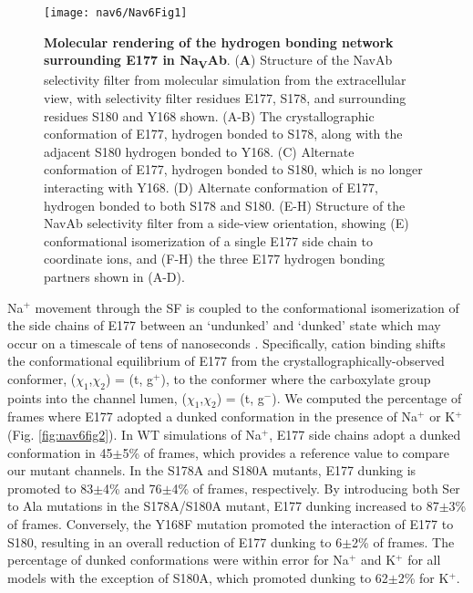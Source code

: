 \begin{refsection}
\begin{figure}[!ptb]
\centering
\texttt{[image: nav6/Nav6Fig1]}
\caption[Molecular rendering of the hydrogen bonding network surrounding E177 in Na\textsubscript{V}Ab]{\textbf{Molecular rendering of the hydrogen bonding network surrounding E177 in Na\textsubscript{V}Ab}. (\textbf{A}) Structure of the NavAb selectivity filter from molecular simulation from the extracellular view, with selectivity filter residues E177, S178, and surrounding residues S180 and Y168 shown. (A-B) The crystallographic conformation of E177, hydrogen bonded to S178, along with the adjacent S180 hydrogen bonded to Y168. (C) Alternate conformation of E177, hydrogen bonded to S180, which is no longer interacting with Y168. (D) Alternate conformation of E177, hydrogen bonded to both S178 and S180. (E-H) Structure of the NavAb selectivity filter from a side-view orientation, showing (E) conformational isomerization of a single E177 side chain to coordinate ions, and (F-H) the three E177 hydrogen bonding partners shown in (A-D).}
\label{fig:nav6fig1}
\end{figure}

	Na$^+$ movement through the SF is coupled to the conformational isomerization of the side chains of E177 between an `undunked' and `dunked' state which may occur on a timescale of tens of nanoseconds \cite{Chakrabarti:2013kd}.  Specifically, cation binding shifts the conformational equilibrium of E177 from the crystallographically-observed conformer, ($\chi_1$,$\chi_2$) = (t, g$^+$), to the conformer where the carboxylate group points into the channel lumen, ($\chi_1$,$\chi_2$) = (t, g$^-$). We computed the percentage of frames where E177 adopted a dunked conformation in the presence of Na$^+$ or K$^+$ (Fig. \ref{fig:nav6fig2}). In WT simulations of Na$^+$, E177 side chains adopt a dunked conformation in 45$\pm$5\% of frames, which provides a reference value to compare our mutant channels. In the S178A and S180A mutants, E177 dunking is promoted to 83$\pm$4\% and 76$\pm$4\% of frames, respectively. By introducing both Ser to Ala mutations in the S178A/S180A mutant, E177 dunking increased to 87$\pm$3\% of frames. Conversely, the Y168F mutation promoted the interaction of E177 to S180, resulting in an overall reduction of E177 dunking to 6$\pm$2\% of frames. The percentage of dunked conformations were within error for Na$^+$ and K$^+$ for all models with the exception of S180A, which promoted dunking to 62$\pm$2\% for K$^+$. 


\end{refsection}
